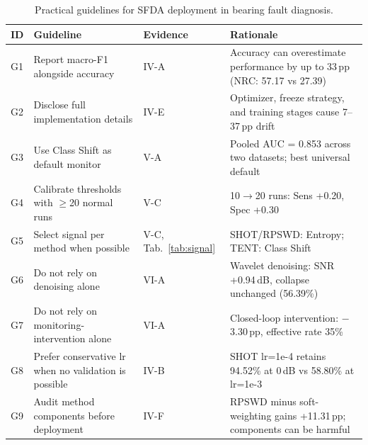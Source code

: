 \begin{table}[!t]
\centering
\footnotesize
\caption{Practical guidelines for SFDA deployment in bearing fault diagnosis.}
\label{tab:guidelines}
\begin{tabular}{lllp{6cm}}
\toprule
ID & Guideline & Evidence & Rationale \\
\midrule
G1 & Report macro-F1 alongside accuracy & IV-A & Accuracy can overestimate performance by up to 33\,pp (NRC: 57.17 vs 27.39) \\
G2 & Disclose full implementation details & IV-E & Optimizer, freeze strategy, and training stages cause 7--37\,pp drift \\
G3 & Use Class Shift as default monitor & V-A & Pooled AUC = 0.853 across two datasets; best universal default \\
G4 & Calibrate thresholds with $\geq$20 normal runs & V-C & 10$\rightarrow$20 runs: Sens +0.20, Spec +0.30 \\
G5 & Select signal per method when possible & V-C, Tab.~\ref{tab:signal} & SHOT/RPSWD: Entropy; TENT: Class Shift \\
G6 & Do not rely on denoising alone & VI-A & Wavelet denoising: SNR +0.94\,dB, collapse unchanged (56.39\%) \\
G7 & Do not rely on monitoring-intervention alone & VI-A & Closed-loop intervention: $-$3.30\,pp, effective rate 35\% \\
G8 & Prefer conservative lr when no validation is possible & IV-B & SHOT lr=1e-4 retains 94.52\% at 0\,dB vs 58.80\% at lr=1e-3 \\
G9 & Audit method components before deployment & IV-F & RPSWD minus soft-weighting gains +11.31\,pp; components can be harmful \\
\bottomrule
\end{tabular}
\end{table}
